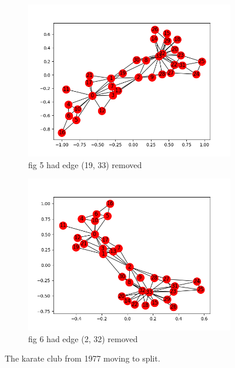 \documentclass[10pt,letterpaper]{article}
\begin{document}
\begin{figure}[H]
\begin{subfigure}[b]{0.4\linewidth}
     \includegraphics[width=\linewidth]{karate05.png} 
     \caption{fig 5 had edge (19, 33) removed}
  \end{subfigure}
   \begin{subfigure}[b]{0.4\linewidth}
     \includegraphics[width=\linewidth]{karate06.png} 
     \caption{fig 6 had edge (2, 32) removed}
  \end{subfigure}

  \caption{The karate club from 1977 moving to split.}
  \label{fig:kart1}
\end{figure}
\end{document}
